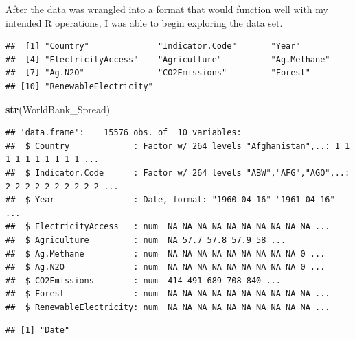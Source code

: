 \documentclass[12pt,]{article}
\newenvironment{Shaded}{\begin{snugshade}}{\end{snugshade}}
\newcommand{\KeywordTok}[1]{\textcolor[rgb]{0.13,0.29,0.53}{\textbf{#1}}}
\newcommand{\CommentTok}[1]{\textcolor[rgb]{0.56,0.35,0.01}{\textit{#1}}}
\newcommand{\OperatorTok}[1]{\textcolor[rgb]{0.81,0.36,0.00}{\textbf{#1}}}
\newcommand{\NormalTok}[1]{#1}
\begin{document}
After the data was wrangled into a format that would function well with
my intended R operations, I was able to begin exploring the data set.

\begin{Shaded}
\end{Shaded}

\begin{verbatim}
##  [1] "Country"              "Indicator.Code"       "Year"                
##  [4] "ElectricityAccess"    "Agriculture"          "Ag.Methane"          
##  [7] "Ag.N2O"               "CO2Emissions"         "Forest"              
## [10] "RenewableElectricity"
\end{verbatim}

\begin{Shaded}
\begin{Highlighting}[]
\KeywordTok{str}\NormalTok{(WorldBank_Spread)}
\end{Highlighting}
\end{Shaded}

\begin{verbatim}
## 'data.frame':    15576 obs. of  10 variables:
##  $ Country             : Factor w/ 264 levels "Afghanistan",..: 1 1 1 1 1 1 1 1 1 1 ...
##  $ Indicator.Code      : Factor w/ 264 levels "ABW","AFG","AGO",..: 2 2 2 2 2 2 2 2 2 2 ...
##  $ Year                : Date, format: "1960-04-16" "1961-04-16" ...
##  $ ElectricityAccess   : num  NA NA NA NA NA NA NA NA NA NA ...
##  $ Agriculture         : num  NA 57.7 57.8 57.9 58 ...
##  $ Ag.Methane          : num  NA NA NA NA NA NA NA NA NA 0 ...
##  $ Ag.N2O              : num  NA NA NA NA NA NA NA NA NA 0 ...
##  $ CO2Emissions        : num  414 491 689 708 840 ...
##  $ Forest              : num  NA NA NA NA NA NA NA NA NA NA ...
##  $ RenewableElectricity: num  NA NA NA NA NA NA NA NA NA NA ...
\end{verbatim}

\begin{Shaded}
\end{Shaded}

\begin{verbatim}
## [1] "Date"
\end{verbatim}
\end{document}

